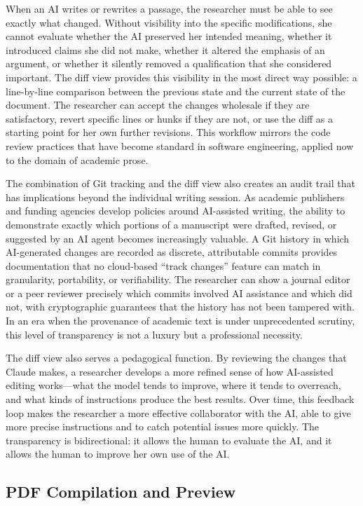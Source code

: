 \documentclass[a4paper,11pt]{article}
\begin{document}
When an AI writes or rewrites a passage, the researcher must be able to see exactly what changed. Without visibility into the specific modifications, she cannot evaluate whether the AI preserved her intended meaning, whether it introduced claims she did not make, whether it altered the emphasis of an argument, or whether it silently removed a qualification that she considered important. The diff view provides this visibility in the most direct way possible: a line-by-line comparison between the previous state and the current state of the document. The researcher can accept the changes wholesale if they are satisfactory, revert specific lines or hunks if they are not, or use the diff as a starting point for her own further revisions. This workflow mirrors the code review practices that have become standard in software engineering, applied now to the domain of academic prose.

The combination of Git tracking and the diff view also creates an audit trail that has implications beyond the individual writing session. As academic publishers and funding agencies develop policies around AI-assisted writing, the ability to demonstrate exactly which portions of a manuscript were drafted, revised, or suggested by an AI agent becomes increasingly valuable. A Git history in which AI-generated changes are recorded as discrete, attributable commits provides documentation that no cloud-based ``track changes'' feature can match in granularity, portability, or verifiability. The researcher can show a journal editor or a peer reviewer precisely which commits involved AI assistance and which did not, with cryptographic guarantees that the history has not been tampered with. In an era when the provenance of academic text is under unprecedented scrutiny, this level of transparency is not a luxury but a professional necessity.

The diff view also serves a pedagogical function. By reviewing the changes that Claude makes, a researcher develops a more refined sense of how AI-assisted editing works---what the model tends to improve, where it tends to overreach, and what kinds of instructions produce the best results. Over time, this feedback loop makes the researcher a more effective collaborator with the AI, able to give more precise instructions and to catch potential issues more quickly. The transparency is bidirectional: it allows the human to evaluate the AI, and it allows the human to improve her own use of the AI.

\subsection{PDF Compilation and Preview}
\end{document}
